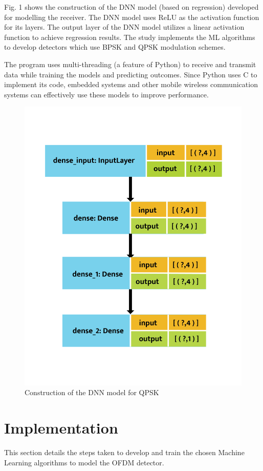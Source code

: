 \documentclass[conference]{IEEEtran}
\begin{document}
Fig. 1 shows the construction of the DNN model (based on regression) developed for modelling the receiver. The DNN model uses ReLU as the activation function for its layers. The output layer of the DNN model utilizes a linear activation function to achieve regression results. The study implements the ML algorithms to develop detectors which use BPSK and QPSK modulation schemes. 

The program uses multi-threading (a feature of Python) to receive and transmit data while training the models and predicting outcomes. Since Python uses C to implement its code, embedded systems and other mobile wireless communication systems can effectively use these models to improve performance.

\begin{figure}[htpb]
\centerline{\includegraphics[scale = 0.45]{model_plot_new-01.png}}
\caption{Construction of the DNN model for QPSK}
\label{dnn_model_plot}
\end{figure}


\section{Implementation}
This section details the steps taken to develop and train the chosen Machine Learning algorithms to model the OFDM detector.
\end{document}
